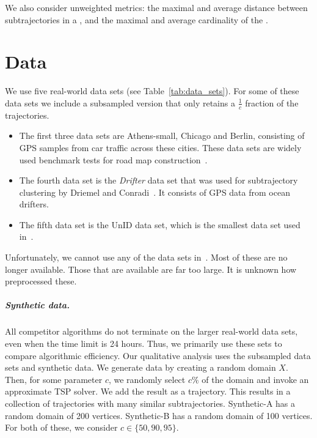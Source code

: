 %
%
\noindent
We also consider unweighted  metrics:
 the maximal and average \frechet distance between subtrajectories in a \pathlet, and
the maximal and average cardinality of the \pathlets.
%
\section{Data}
%
We use five real-world data sets (see Table~\ref{tab:data_sets}). For some of these data sets we include a subsampled version that only retains a $\frac{1}{c}$ fraction of the trajectories.
%
\begin{itemize}
    \item The first three data sets are Athens-small, Chicago and Berlin, consisting of GPS samples from car traffic across these cities.  These data sets are widely used
benchmark tests for road map construction~\cite{ahmed2015comparison, buchin2017clustering, wang2015efficient, huang2018automatic}. 
\item 
The fourth data set is the \emph{Drifter} data set that was used for subtrajectory clustering by Driemel and Conradi~\cite{conradi2023finding}. It consists of GPS data from ocean drifters.
\item The fifth data set is the UnID data set, which is the smallest data set used in~\cite{9827305}. 
\end{itemize}
%
\noindent
Unfortunately, we cannot use any of the data sets in~\cite{agarwal2018subtrajectory}. Most of these are no longer available.  Those that are available are far too large. It is unknown how~\cite{agarwal2018subtrajectory} preprocessed these. 
%
\subparagraph{Synthetic data.}
All competitor algorithms do not terminate on the larger real-world data sets, even when the time limit is 24 hours. Thus, we primarily use these sets to  compare algorithmic efficiency. 
Our qualitative analysis uses the subsampled data sets and synthetic data. We generate data by creating a random domain $X$. 
Then, for some parameter $c$, we randomly select $c \%$ of the domain and invoke an approximate TSP solver. We add the result as a trajectory. This results in a collection of trajectories with many similar subtrajectories. 
Synthetic-A has a random domain of 200 vertices. Synthetic-B has a random domain of 100 vertices. For both of these, we consider $c \in \{50, 90, 95\}$.
%
%
\vspace{1cm}
%
%
%
%
